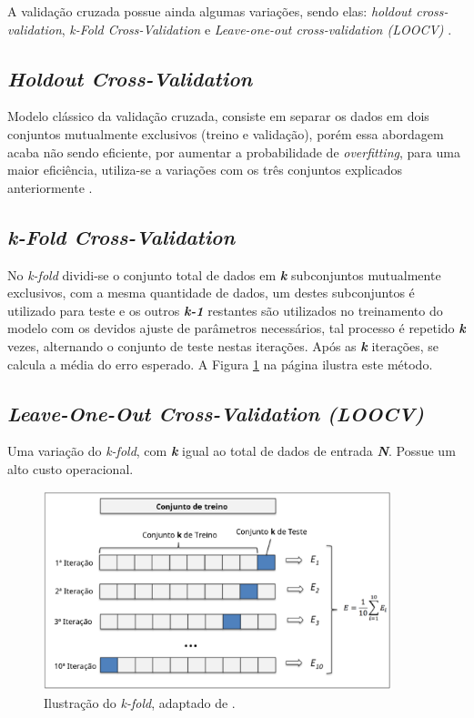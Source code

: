 A validação cruzada possue ainda algumas variações, sendo elas: \textit{holdout cross-validation}, \textit{k-Fold Cross-Validation} e \textit{Leave-one-out cross-validation (LOOCV)} \cite{james2013introduction}.


\subsection{\textit{Holdout Cross-Validation}}
Modelo clássico da validação cruzada, consiste em separar os dados em dois conjuntos mutualmente exclusivos (treino e validação), porém essa abordagem acaba não sendo eficiente, por aumentar a probabilidade de \textit{overfitting}, para uma maior eficiência, utiliza-se a variações com os três conjuntos explicados anteriormente \cite{raschka2015python}.

\subsection{\textit{k-Fold Cross-Validation}}
No \textit{k-fold} dividi-se o conjunto total de dados em \textbf{\textit{k}} subconjuntos mutualmente exclusivos, com a mesma quantidade de dados, um destes subconjuntos é utilizado para teste e os outros \textbf{\textit{k-1}} restantes são utilizados no treinamento do modelo com os devidos ajuste de parâmetros necessários, tal processo é repetido \textbf{\textit{k}} vezes, alternando o conjunto de teste nestas iterações. Após as \textbf{\textit{k}} iterações, se calcula a média do erro esperado. A Figura \ref{kfold} na página \pageref{kfold} ilustra este método.

\subsection{\textit{Leave-One-Out Cross-Validation (LOOCV)}} Uma variação do \textit{k-fold}, com \textbf{\textit{k}} igual ao total de dados de entrada \textbf{\textit{N}}. Possue um alto custo operacional.

\begin{figure}[!htb]
    \centering
     \includegraphics[width=0.9\textwidth]{figuras/kfold.eps}
     \caption{Ilustração do \textit{k-fold}, adaptado de .}
     \label{kfold}
\end{figure}


